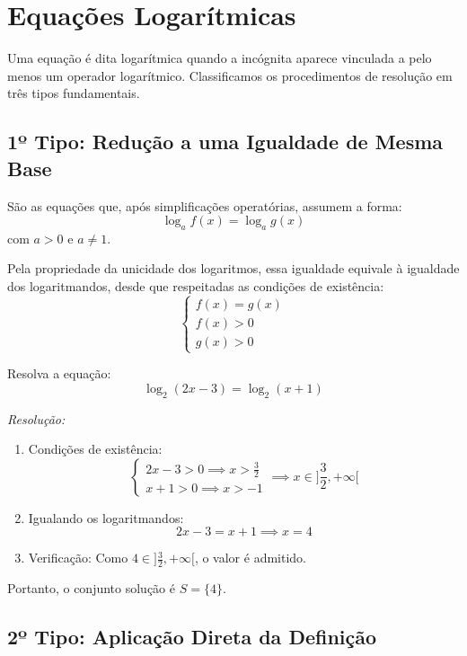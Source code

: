 \documentclass[12pt,a4paper]{report}
\begin{document}
	\section{Equações Logarítmicas}
	
	Uma equação é dita logarítmica quando a incógnita aparece vinculada a pelo menos um operador logarítmico. Classificamos os procedimentos de resolução em três tipos fundamentais.
	
	\subsection{1º Tipo: Redução a uma Igualdade de Mesma Base}
	
	São as equações que, após simplificações operatórias, assumem a forma:
	$$\log_a f(x) = \log_a g(x)$$
	com $a > 0$ e $a \neq 1$.
	
	Pela propriedade da unicidade dos logaritmos, essa igualdade equivale à igualdade dos logaritmandos, desde que respeitadas as condições de existência:
	$$\begin{cases}
		f(x) = g(x) \\
		f(x) > 0 \\
		g(x) > 0
	\end{cases}$$
	
	\newpage
	
	\begin{destaque}
		Resolva a equação:
		$$\log_2 (2x - 3) = \log_2 (x + 1)$$
		
		\textit{Resolução:}
		\begin{enumerate}[label=\textbf{\arabic*.}]
			\item Condições de existência:
			$$\begin{cases} 
				2x - 3 > 0 \implies x > \frac{3}{2} \\
				x + 1 > 0 \implies x > -1
			\end{cases} \implies x \in {]\frac{3}{2}, +\infty[}$$
			
			\item Igualando os logaritmandos:
			$$2x - 3 = x + 1 \implies x = 4$$
			
			\item Verificação:
			Como $4 \in {]\frac{3}{2}, +\infty[}$, o valor é admitido.
		\end{enumerate}
		Portanto, o conjunto solução é $S = \{4\}$.
	\end{destaque}
	
	\subsection{2º Tipo: Aplicação Direta da Definição}
	
\end{document}
